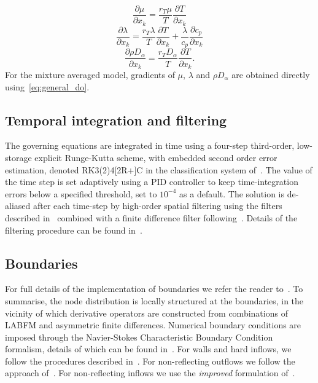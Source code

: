 \documentclass[notitlepage]{revtex4-1}
\begin{document}
\begin{equation}\frac{\partial\mu}{\partial{x}_{k}}=\frac{r_{T}\mu}{T}\frac{\partial{T}}{\partial{x}_{k}}\end{equation}
\begin{equation}\frac{\partial\lambda}{\partial{x}_{k}}=\frac{r_{T}\lambda}{T}\frac{\partial{T}}{\partial{x}_{k}}+\frac{\lambda}{c_{p}}\frac{\partial{c_{p}}}{\partial{x}_{k}}\end{equation}
\begin{equation}\frac{\partial\rho{D}_{\alpha}}{\partial{x}_{k}}=\frac{r_{T}D_{\alpha}}{T}\frac{\partial{T}}{\partial{x}_{k}}.\end{equation}
For the mixture averaged model, gradients of $\mu$, $\lambda$ and $\rho{D}_{\alpha}$ are obtained directly using~\eqref{eq:general_do}.

\subsection{Temporal integration and filtering}

The governing equations are integrated in time using a four-step third-order, low-storage explicit Runge-Kutta scheme, with embedded second order error estimation, denoted RK3(2)4[2R+]C in the classification system of~\citet{kennedy_2000}. The value of the time step is set adaptively using a PID controller to keep time-integration errors below a specified threshold, set to $10^{-4}$ as a default. The solution is de-aliased after each time-step by high-order spatial filtering using the filters described in~\cite{king_2022} combined with a finite difference filter following~\cite{kennedy_1994}. Details of the filtering procedure can be found in~\cite{king_2023}.


\subsection{Boundaries}

For full details of the implementation of boundaries we refer the reader to~\cite{king_2022,king_2023}. To summarise, the node distribution is locally structured at the boundaries, in the vicinity of which derivative operators are constructed from combinations of LABFM and asymmetric finite differences. Numerical boundary conditions are imposed through the Navier-Stokes Characteristic Boundary Condition formalism, details of which can be found in~\cite{poinsot_2005,sutherland_2003,yoo_2007}. For walls and hard inflows, we follow the procedures described in~\cite{poinsot_2005}. For non-reflecting outflows we follow the approach of~\cite{sutherland_2003}. For non-reflecting inflows we use the \emph{improved} formulation of~\cite{yoo_2007}.
\end{document}
